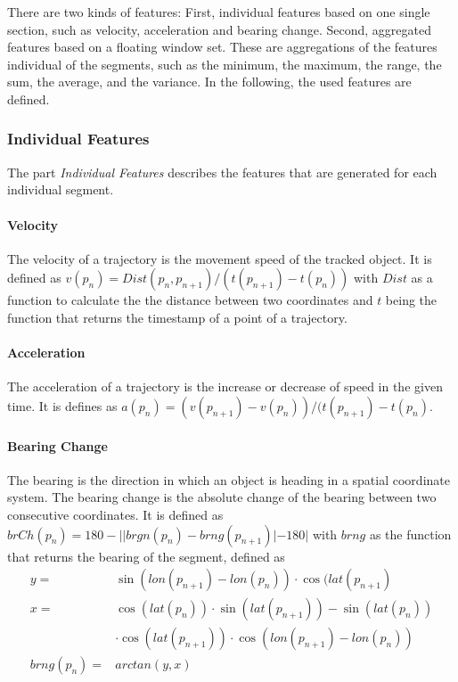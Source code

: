 There are two kinds of features: First, individual features based on one single section, such as velocity, acceleration and bearing change. Second, aggregated features based on a floating window set. These are aggregations of the features individual of the segments, such as the minimum, the maximum, the range, the sum, the average, and the variance. In the following, the used features are defined.

\subsubsection{Individual Features}
The part \textit{Individual Features} describes the features that are generated for each individual segment. 

\paragraph{Velocity} The velocity of a trajectory is the movement speed of the tracked object. It is defined as $v(p_n) = Dist(p_n, p_{n+1})/(t(p_{n+1}) - t(p_n))$ with $Dist$ as a function to calculate the the distance between two coordinates and $t$ being the function that returns the timestamp of a point of a trajectory. \cite{Zheng2008}

\paragraph{Acceleration} The acceleration of a trajectory is the increase or decrease of speed in the given time. It is defines as $ a(p_n) = (v(p_{n+1}) - v(p_n))/(t(p_{n+1}) - t(p_n)$. \cite{Zheng2008}

\paragraph{Bearing Change} The bearing is the direction in which an object is heading in a spatial coordinate system. The bearing change is the absolute change of the bearing between two consecutive coordinates. It is defined as $ brCh(p_n) = 180 - | |brgn(p_n) - brng(p_{n+1})
| - 180| $ with $brng$ as the function that returns the bearing of the segment, defined as 
\begin{align*}
            y =& \sin (lon(p_{n+1})-lon(p_n)) \cdot \cos(lat(p_{n+1}) \\ 
            x =& \cos (lat(p_n)) \cdot \sin (lat(p_{n+1}))-\sin (lat(p_n))\\
               & \cdot \cos (lat(p_{n+1})) \cdot \cos(lon(p_{n+1})-lon(p_n)) \\
    brng(p_n) =& arctan(y,x)
\end{align*} \cite{Dabiri2018}

